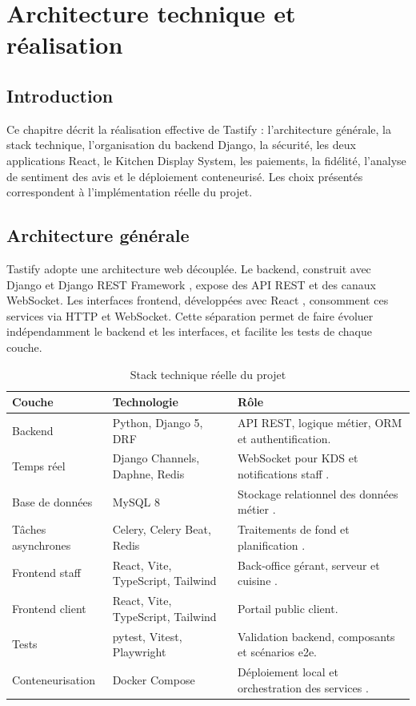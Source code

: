 \chapter{Architecture technique et réalisation}
\label{chap:realisation}

\section*{Introduction}
Ce chapitre décrit la réalisation effective de Tastify : l'architecture générale, la stack technique, l'organisation du backend Django, la sécurité, les deux applications React, le Kitchen Display System, les paiements, la fidélité, l'analyse de sentiment des avis et le déploiement conteneurisé. Les choix présentés correspondent à l'implémentation réelle du projet.

\section{Architecture générale}
Tastify adopte une architecture web découplée. Le backend, construit avec Django et Django REST Framework \cite{django,drf}, expose des API REST et des canaux WebSocket. Les interfaces frontend, développées avec React \cite{react}, consomment ces services via HTTP et WebSocket. Cette séparation permet de faire évoluer indépendamment le backend et les interfaces, et facilite les tests de chaque couche.

\begin{table}[H]
\centering
\caption{Stack technique réelle du projet}
\begin{tabular}{p{4cm}p{4cm}p{6cm}}
\toprule
\textbf{Couche} & \textbf{Technologie} & \textbf{Rôle} \\
\midrule
Backend & Python, Django 5, DRF & API REST, logique métier, ORM et authentification. \\
Temps réel & Django Channels, Daphne, Redis & WebSocket pour KDS et notifications staff \cite{channels}. \\
Base de données & MySQL 8 & Stockage relationnel des données métier \cite{mysql}. \\
Tâches asynchrones & Celery, Celery Beat, Redis & Traitements de fond et planification \cite{celery,redis}. \\
Frontend staff & React, Vite, TypeScript, Tailwind & Back-office gérant, serveur et cuisine \cite{vite,tailwind}. \\
Frontend client & React, Vite, TypeScript, Tailwind & Portail public client. \\
Tests & pytest, Vitest, Playwright & Validation backend, composants et scénarios e2e. \\
Conteneurisation & Docker Compose & Déploiement local et orchestration des services \cite{docker}. \\
\bottomrule
\end{tabular}
\end{table}


